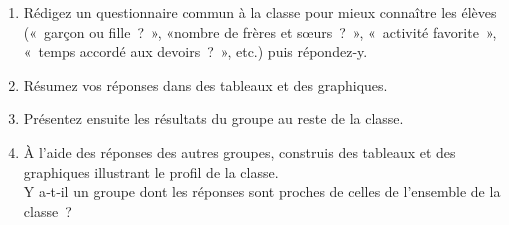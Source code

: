 
\begin{TP}[Enquête]


\begin{enumerate}
 \item Rédigez un questionnaire commun à la classe pour mieux connaître les élèves (« garçon ou fille ? », «nombre de frères et sœurs ? », « activité favorite », « temps accordé aux devoirs ? », etc.) puis répondez‑y.
 \item Résumez vos réponses dans des tableaux et des graphiques.
 \item Présentez ensuite les résultats du groupe au reste de la classe.
 \end{enumerate}
 

\begin{enumerate}
\setcounter{enumi}{3}
 \item À l'aide des réponses des autres groupes, construis des tableaux et des graphiques illustrant le profil de la classe. \\[1em]
Y a‑t‑il un groupe dont les réponses sont proches de celles de l'ensemble de la classe ?
 \end{enumerate}
 
\end{TP}

